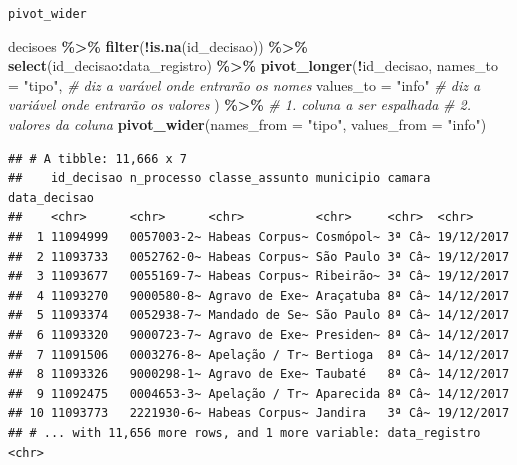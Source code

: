 \documentclass[
  10pt,
  ignorenonframetext,
]{beamer}
\newenvironment{Shaded}{\begin{snugshade}}{\end{snugshade}}
\newcommand{\CommentTok}[1]{\textcolor[rgb]{0.56,0.35,0.01}{\textit{#1}}}
\newcommand{\DataTypeTok}[1]{\textcolor[rgb]{0.13,0.29,0.53}{#1}}
\newcommand{\KeywordTok}[1]{\textcolor[rgb]{0.13,0.29,0.53}{\textbf{#1}}}
\newcommand{\NormalTok}[1]{#1}
\newcommand{\OperatorTok}[1]{\textcolor[rgb]{0.81,0.36,0.00}{\textbf{#1}}}
\newcommand{\StringTok}[1]{\textcolor[rgb]{0.31,0.60,0.02}{#1}}
\begin{document}
\begin{frame}[fragile]{\texttt{pivot\_wider}}
\protect\hypertarget{pivot_wider}{}
\begin{Shaded}
\begin{Highlighting}[]
\NormalTok{decisoes }\OperatorTok{\%\textgreater{}\%}\StringTok{ }
\StringTok{  }\KeywordTok{filter}\NormalTok{(}\OperatorTok{!}\KeywordTok{is.na}\NormalTok{(id\_decisao)) }\OperatorTok{\%\textgreater{}\%}\StringTok{ }
\StringTok{  }\KeywordTok{select}\NormalTok{(id\_decisao}\OperatorTok{:}\NormalTok{data\_registro) }\OperatorTok{\%\textgreater{}\%}\StringTok{ }
\StringTok{  }\KeywordTok{pivot\_longer}\NormalTok{(}\OperatorTok{!}\NormalTok{id\_decisao, }
               \DataTypeTok{names\_to =} \StringTok{"tipo"}\NormalTok{, }\CommentTok{\# diz a varável onde entrarão os nomes}
               \DataTypeTok{values\_to =} \StringTok{"info"} \CommentTok{\# diz a variável onde entrarão os valores}
\NormalTok{               ) }\OperatorTok{\%\textgreater{}\%}\StringTok{ }
\StringTok{  }\CommentTok{\# 1. coluna a ser espalhada}
\StringTok{  }\CommentTok{\# 2. valores da coluna}
\StringTok{  }\KeywordTok{pivot\_wider}\NormalTok{(}\DataTypeTok{names\_from =} \StringTok{"tipo"}\NormalTok{,}
              \DataTypeTok{values\_from =} \StringTok{"info"}\NormalTok{)}
\end{Highlighting}
\end{Shaded}

\begin{verbatim}
## # A tibble: 11,666 x 7
##    id_decisao n_processo classe_assunto municipio camara data_decisao
##    <chr>      <chr>      <chr>          <chr>     <chr>  <chr>       
##  1 11094999   0057003-2~ Habeas Corpus~ Cosmópol~ 3ª Câ~ 19/12/2017  
##  2 11093733   0052762-0~ Habeas Corpus~ São Paulo 3ª Câ~ 19/12/2017  
##  3 11093677   0055169-7~ Habeas Corpus~ Ribeirão~ 3ª Câ~ 19/12/2017  
##  4 11093270   9000580-8~ Agravo de Exe~ Araçatuba 8ª Câ~ 14/12/2017  
##  5 11093374   0052938-7~ Mandado de Se~ São Paulo 8ª Câ~ 14/12/2017  
##  6 11093320   9000723-7~ Agravo de Exe~ Presiden~ 8ª Câ~ 14/12/2017  
##  7 11091506   0003276-8~ Apelação / Tr~ Bertioga  8ª Câ~ 14/12/2017  
##  8 11093326   9000298-1~ Agravo de Exe~ Taubaté   8ª Câ~ 14/12/2017  
##  9 11092475   0004653-3~ Apelação / Tr~ Aparecida 8ª Câ~ 14/12/2017  
## 10 11093773   2221930-6~ Habeas Corpus~ Jandira   3ª Câ~ 19/12/2017  
## # ... with 11,656 more rows, and 1 more variable: data_registro <chr>
\end{verbatim}
\end{frame}
\end{document}
